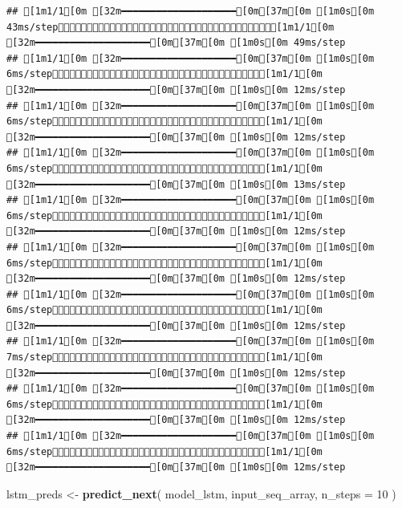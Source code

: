 \documentclass[
]{article}
\newenvironment{Shaded}{\begin{snugshade}}{\end{snugshade}}
\newcommand{\AttributeTok}[1]{\textcolor[rgb]{0.13,0.29,0.53}{#1}}
\newcommand{\DecValTok}[1]{\textcolor[rgb]{0.00,0.00,0.81}{#1}}
\newcommand{\FunctionTok}[1]{\textcolor[rgb]{0.13,0.29,0.53}{\textbf{#1}}}
\newcommand{\NormalTok}[1]{#1}
\newcommand{\OtherTok}[1]{\textcolor[rgb]{0.56,0.35,0.01}{#1}}
\begin{document}
\begin{verbatim}
## [1m1/1[0m [32m━━━━━━━━━━━━━━━━━━━━[0m[37m[0m [1m0s[0m 43ms/step[1m1/1[0m [32m━━━━━━━━━━━━━━━━━━━━[0m[37m[0m [1m0s[0m 49ms/step
## [1m1/1[0m [32m━━━━━━━━━━━━━━━━━━━━[0m[37m[0m [1m0s[0m 6ms/step[1m1/1[0m [32m━━━━━━━━━━━━━━━━━━━━[0m[37m[0m [1m0s[0m 12ms/step
## [1m1/1[0m [32m━━━━━━━━━━━━━━━━━━━━[0m[37m[0m [1m0s[0m 6ms/step[1m1/1[0m [32m━━━━━━━━━━━━━━━━━━━━[0m[37m[0m [1m0s[0m 12ms/step
## [1m1/1[0m [32m━━━━━━━━━━━━━━━━━━━━[0m[37m[0m [1m0s[0m 6ms/step[1m1/1[0m [32m━━━━━━━━━━━━━━━━━━━━[0m[37m[0m [1m0s[0m 13ms/step
## [1m1/1[0m [32m━━━━━━━━━━━━━━━━━━━━[0m[37m[0m [1m0s[0m 6ms/step[1m1/1[0m [32m━━━━━━━━━━━━━━━━━━━━[0m[37m[0m [1m0s[0m 12ms/step
## [1m1/1[0m [32m━━━━━━━━━━━━━━━━━━━━[0m[37m[0m [1m0s[0m 6ms/step[1m1/1[0m [32m━━━━━━━━━━━━━━━━━━━━[0m[37m[0m [1m0s[0m 12ms/step
## [1m1/1[0m [32m━━━━━━━━━━━━━━━━━━━━[0m[37m[0m [1m0s[0m 6ms/step[1m1/1[0m [32m━━━━━━━━━━━━━━━━━━━━[0m[37m[0m [1m0s[0m 12ms/step
## [1m1/1[0m [32m━━━━━━━━━━━━━━━━━━━━[0m[37m[0m [1m0s[0m 7ms/step[1m1/1[0m [32m━━━━━━━━━━━━━━━━━━━━[0m[37m[0m [1m0s[0m 12ms/step
## [1m1/1[0m [32m━━━━━━━━━━━━━━━━━━━━[0m[37m[0m [1m0s[0m 6ms/step[1m1/1[0m [32m━━━━━━━━━━━━━━━━━━━━[0m[37m[0m [1m0s[0m 12ms/step
## [1m1/1[0m [32m━━━━━━━━━━━━━━━━━━━━[0m[37m[0m [1m0s[0m 6ms/step[1m1/1[0m [32m━━━━━━━━━━━━━━━━━━━━[0m[37m[0m [1m0s[0m 12ms/step
\end{verbatim}

\begin{Shaded}
\begin{Highlighting}[]
\NormalTok{lstm\_preds }\OtherTok{\textless{}{-}} \FunctionTok{predict\_next}\NormalTok{(}
\NormalTok{  model\_lstm, }
\NormalTok{  input\_seq\_array, }
  \AttributeTok{n\_steps =} \DecValTok{10}
\NormalTok{)}
\end{Highlighting}
\end{Shaded}
\end{document}
